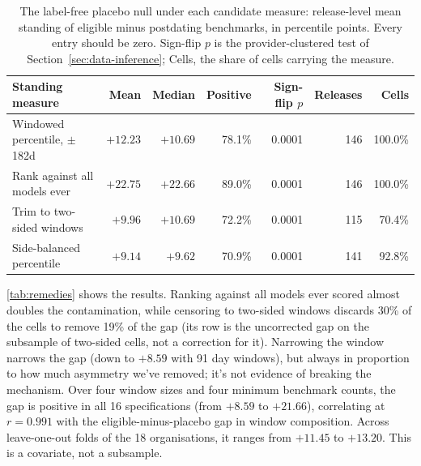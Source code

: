 \documentclass{article}
\begin{document}
\begin{table}[!htb]
\centering
\small
\setlength{\tabcolsep}{4pt}
\begin{tabular}{lrrrrrr}
\toprule
Standing measure & Mean & Median & Positive & Sign-flip $p$ & Releases & Cells \\
\midrule
Windowed percentile, $\pm$182d & $+12.23$ & $+10.69$ & 78.1\% & 0.0001 & 146 & 100.0\% \\
Rank against all models ever & $+22.75$ & $+22.66$ & 89.0\% & 0.0001 & 146 & 100.0\% \\
Trim to two-sided windows & $+9.96$ & $+10.69$ & 72.2\% & 0.0001 & 115 & 70.4\% \\
Side-balanced percentile & $+9.14$ & $+9.62$ & 70.9\% & 0.0001 & 141 & 92.8\% \\
\bottomrule
\end{tabular}
\caption{%
The label-free placebo null under each candidate measure: release-level mean standing of eligible minus postdating benchmarks, in percentile points. Every entry should be zero. Sign-flip $p$ is the provider-clustered test of Section~\ref{sec:data-inference}; Cells, the share of cells carrying the measure.}
\label{tab:remedies}
\end{table}

\autoref{tab:remedies} shows the results. Ranking against all models ever scored almost doubles the contamination, while censoring to two-sided windows discards 30\% of the cells to remove 19\% of the gap (its row is the uncorrected gap on the subsample of two-sided cells, not a correction for it). Narrowing the window narrows the gap (down to $+8.59$ with 91 day windows), but always in proportion to how much asymmetry we've removed; it's not evidence of breaking the mechanism. Over four window sizes and four minimum benchmark counts, the gap is positive in all 16 specifications (from $+8.59$ to $+21.66$), correlating at $r = 0.991$ with the eligible-minus-placebo gap in window composition. Across leave-one-out folds of the 18 organisations, it ranges from $+11.45$ to $+13.20$. This is a covariate, not a subsample.
\end{document}
